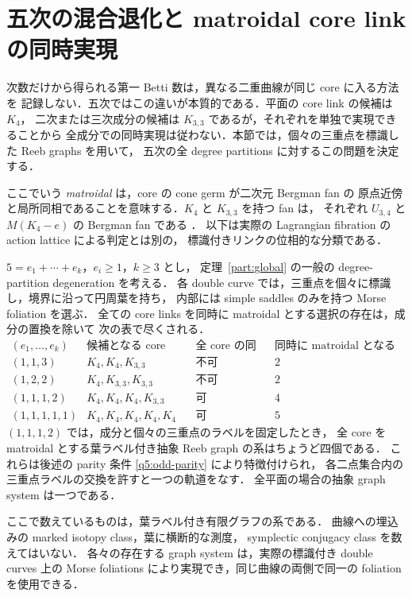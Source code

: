 \section{五次の混合退化と matroidal core link の同時実現}
\label{q5:section}

次数だけから得られる第一 Betti 数は，異なる二重曲線が同じ core に入る方法を
記録しない．五次ではこの違いが本質的である．平面の core link の候補は $K_4$，
二次または三次成分の候補は $K_{3,3}$ であるが，それぞれを単独で実現できることから
全成分での同時実現は従わない．本節では，個々の三重点を標識した Reeb graphs を用いて，
五次の全 degree partitions に対するこの問題を決定する．

ここでいう \emph{matroidal} は，core の cone germ が二次元 Bergman fan の
原点近傍と局所同相であることを意味する．$K_4$ と $K_{3,3}$ を持つ fan は，
それぞれ $U_{3,4}$ と $M(K_4-e)$ の Bergman fan である
\cite[Examples 1.1--1.2 and Theorem 4.1]{FeichtnerSturmfels}．
以下は実際の Lagrangian fibration の action lattice による判定とは別の，
標識付きリンクの位相的な分類である．

\begin{theorem}
\label{q5:classification}
$5=e_1+\cdots+e_k$，$e_i\geq1$，$k\geq3$ とし，
定理~\ref{part:global} の一般の degree-partition degeneration を考える．
各 double curve では，三重点を個々に標識し，境界に沿って円周葉を持ち，
内部には simple saddles のみを持つ Morse foliation を選ぶ．
全ての core links を同時に matroidal とする選択の存在は，成分の置換を除いて
次の表で尽くされる．
\[
\begin{array}{c|c|c|c}
 (e_1,\ldots,e_k)&\text{候補となる core links}
 &\text{全 core の同時実現}&\text{同時に matroidal となる最大個数}\\\hline
 (1,1,3)&K_4,K_4,K_{3,3}&\text{不可}&2\\
 (1,2,2)&K_4,K_{3,3},K_{3,3}&\text{不可}&2\\
 (1,1,1,2)&K_4,K_4,K_4,K_{3,3}&\text{可}&4\\
 (1,1,1,1,1)&K_4,K_4,K_4,K_4,K_4&\text{可}&5
\end{array}
\]
$(1,1,1,2)$ では，成分と個々の三重点のラベルを固定したとき，
全 core を matroidal とする葉ラベル付き抽象 Reeb graph の系はちょうど四個である．
これらは後述の parity 条件 \eqref{q5:odd-parity} により特徴付けられ，
各二点集合内の三重点ラベルの交換を許すと一つの軌道をなす．
全平面の場合の抽象 graph system は一つである．

ここで数えているものは，葉ラベル付き有限グラフの系である．
曲線への埋込みの marked isotopy class，葉に横断的な測度，
symplectic conjugacy class を数えてはいない．
各々の存在する graph system は，実際の標識付き double curves 上の
Morse foliations により実現でき，同じ曲線の両側で同一の foliation を使用できる．
\end{theorem}

